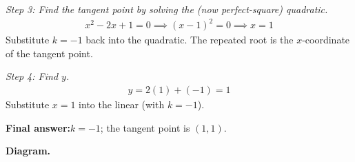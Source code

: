 \documentclass[11pt]{article}
\begin{document}
\textit{Step 3: Find the tangent point by solving the (now perfect-square) quadratic.}
\[\begin{gathered}
x^2 - 2x + 1 = 0 \implies (x - 1)^2 = 0 \implies x = 1
\end{gathered}\]
Substitute \( k = -1 \) back into the quadratic. The repeated root is the \( x \)-coordinate of the tangent point.

\textit{Step 4: Find \( y \).}
\[\begin{gathered}
y = 2(1) + (-1) = 1
\end{gathered}\]
Substitute \( x = 1 \) into the linear (with \( k = -1 \)).

\begin{answerbox}
\textbf{Final answer:}\quad \(\displaystyle k = -1\); the tangent point is \(\displaystyle (1, 1)\).
\end{answerbox}
\textbf{Diagram.}
\end{document}

